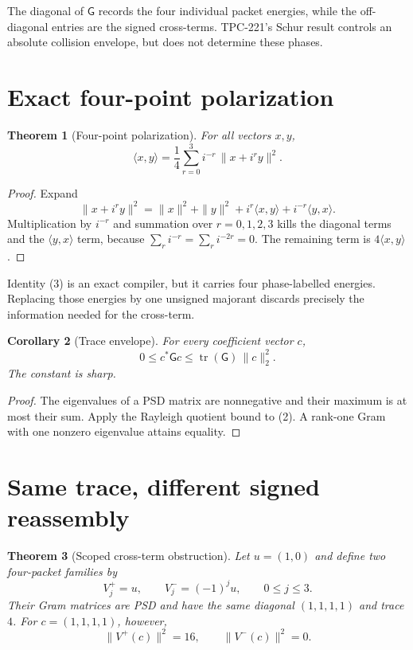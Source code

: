 \documentclass[11pt]{article}
\newtheorem{theorem}{Theorem}
\newtheorem{corollary}[theorem]{Corollary}
\newcommand{\G}{\mathsf G}
\begin{document}
The diagonal of $\G$ records the four individual packet energies, while the off-diagonal
entries are the signed cross-terms.  TPC-221's Schur result controls an absolute collision
envelope, but does not determine these phases.

\section{Exact four-point polarization}

\begin{theorem}[Four-point polarization]
For all vectors $x,y$,
\[
 \langle x,y\rangle
 =\frac14\sum_{r=0}^3 i^{-r}\,\|x+i^r y\|^2.
 \tag{3}
\]
\end{theorem}

\begin{proof}
Expand
\[
 \|x+i^r y\|^2=\|x\|^2+\|y\|^2
 +i^r\langle x,y\rangle+i^{-r}\langle y,x\rangle.
\]
Multiplication by $i^{-r}$ and summation over $r=0,1,2,3$ kills the diagonal terms and
the $\langle y,x\rangle$ term, because $\sum_r i^{-r}=\sum_r i^{-2r}=0$.  The remaining
term is $4\langle x,y\rangle$.
\end{proof}

Identity (3) is an exact compiler, but it carries four phase-labelled energies.  Replacing
those energies by one unsigned majorant discards precisely the information needed for the
cross-term.

\begin{corollary}[Trace envelope]
For every coefficient vector $c$,
\[
 0\leq c^*\G c\leq \operatorname{tr}(\G)\,\|c\|_2^2.
 \tag{4}
\]
The constant is sharp.
\end{corollary}

\begin{proof}
The eigenvalues of a PSD matrix are nonnegative and their maximum is at most their sum.
Apply the Rayleigh quotient bound to (2).  A rank-one Gram with one nonzero eigenvalue
attains equality.
\end{proof}

\section{Same trace, different signed reassembly}

\begin{theorem}[Scoped cross-term obstruction]
Let $u=(1,0)$ and define two four-packet families by
\[
 V_j^+=u,\qquad V_j^-=(-1)^j u,\qquad 0\leq j\leq3.
\]
Their Gram matrices are PSD and have the same diagonal $(1,1,1,1)$ and trace $4$.  For
$c=(1,1,1,1)$, however,
\[
 \|V^+(c)\|^2=16,\qquad \|V^-(c)\|^2=0.
 \tag{5}
\]
\end{theorem}
\end{document}
